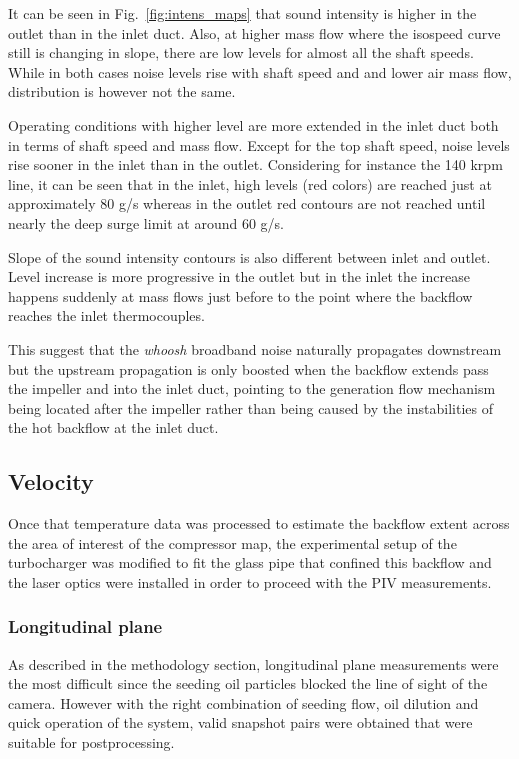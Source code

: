 It can be seen in Fig.~\ref{fig:intens_maps} that sound intensity is higher in the outlet than in the inlet duct. Also, at higher mass flow where the isospeed curve still is changing in slope, there are low levels for almost all the shaft speeds. While in both cases noise levels rise with shaft speed and and lower air mass flow, distribution is however not the same.

Operating conditions with higher level are more extended in the inlet duct both in terms of shaft speed and mass flow. Except for the top shaft speed, noise levels rise sooner in the inlet than in the outlet. Considering for instance the 140 krpm line, it can be seen that in the inlet, high levels (red colors) are reached just at approximately 80 g/s whereas in the outlet red contours are not reached until nearly the deep surge limit at around 60 g/s.

Slope of the sound intensity contours is also different between inlet and outlet. Level increase is more progressive in the outlet but in the inlet the increase happens suddenly at mass flows just before to the point where the backflow reaches the inlet thermocouples.

This suggest that the \emph{whoosh} broadband noise naturally propagates downstream but the upstream propagation is only boosted when the backflow extends pass the impeller and into the inlet duct, pointing to the generation flow mechanism being located after the impeller rather than being caused by the instabilities of the hot backflow at the inlet duct.

\subsection{Velocity}
\label{sub:velocity}

Once that temperature data was processed to estimate the backflow extent across the area of interest of the compressor map, the experimental setup of the turbocharger was modified to fit the glass pipe that confined this backflow and the laser optics were installed in order to proceed with the PIV measurements.

\subsubsection{Longitudinal plane}

As described in the methodology section, longitudinal plane measurements were the most difficult since the seeding oil particles blocked the line of sight of the camera. However with the right combination of seeding flow, oil dilution and quick operation of the system, valid snapshot pairs were obtained that were suitable for postprocessing.

